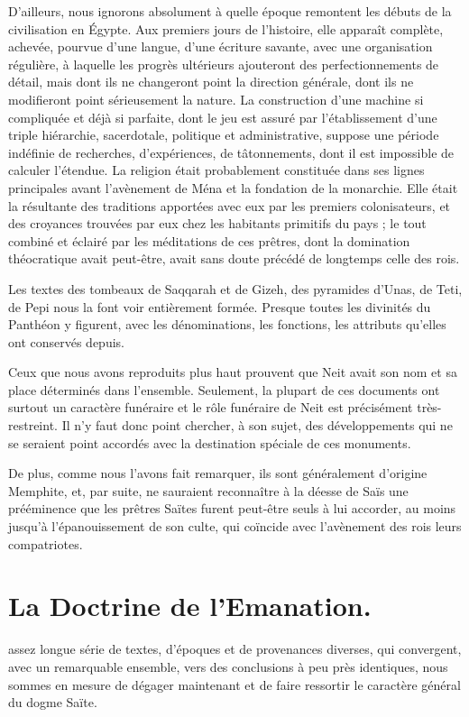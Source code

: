 \documentclass[letterpaper,twocolumn,openany,nodeprecatedcode]{dndbook}
\begin{document}
D'ailleurs, nous ignorons absolument à quelle époque remontent les débuts de la civilisation en Égypte. Aux premiers jours de l'histoire, elle apparaît complète, achevée, pourvue d'une langue, d’une écriture savante, avec une organisation régulière, à laquelle les progrès ultérieurs ajouteront des perfectionnements de détail, mais dont ils ne changeront point la direction générale, dont ils ne modifieront point sérieusement la nature. La construction d'une machine si compliquée et déjà si parfaite, dont le jeu est assuré par l'établissement d'une triple hiérarchie, sacerdotale, politique et administrative, suppose une période indéfinie de recherches, d'expériences, de tâtonnements, dont il est impossible de calculer l'étendue. La religion était probablement constituée dans ses lignes principales avant l'avènement de Ména et la fondation de la monarchie. Elle était la résultante des traditions apportées avec eux par les premiers colonisateurs, et des croyances trouvées par eux chez les habitants primitifs du pays ; le tout combiné et éclairé par les méditations de ces prêtres, dont la domination théocratique avait peut-être, avait sans doute précédé de longtemps celle des rois.

Les textes des tombeaux de Saqqarah et de Gizeh, des pyramides d'Unas, de Teti, de Pepi nous la font voir entièrement formée. Presque toutes les divinités du Panthéon y figurent, avec les dénominations, les fonctions, les attributs qu'elles ont conservés depuis.

Ceux que nous avons reproduits plus haut prouvent que Neit avait son nom et sa place déterminés dans l'ensemble. Seulement, la plupart de ces documents ont surtout un caractère funéraire et le rôle funéraire de Neit est précisément très-restreint. Il n'y faut donc point chercher, à son sujet, des développements qui ne se seraient point accordés avec la destination spéciale de ces monuments.

De plus, comme nous l'avons fait remarquer, ils sont généralement d'origine Memphite, et, par suite, ne sauraient reconnaître à la déesse de Saïs une prééminence que les prêtres Saïtes furent peut-être seuls à lui accorder, au moins jusqu'à l'épanouissement de son culte, qui coïncide avec l'avènement des rois leurs compatriotes.
\clearpage
\chapter{La Doctrine de l'Emanation.}
 assez longue série de textes, d'époques et de provenances diverses, qui convergent, avec un remarquable ensemble, vers des conclusions à peu près identiques, nous sommes en mesure de dégager maintenant et de faire ressortir le caractère général du dogme Saïte.
\end{document}
